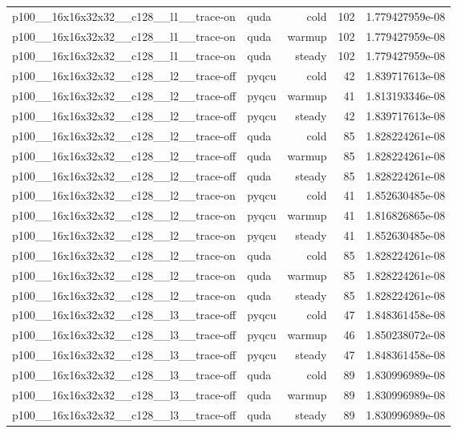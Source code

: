 \begin{table}[htbp]
\begin{tabular}{@{}llrrr@{}}
p100\_\_16x16x32x32\_\_c128\_\_l1\_\_trace-on & quda & cold & 102 & 1.779427959e-08 \\
p100\_\_16x16x32x32\_\_c128\_\_l1\_\_trace-on & quda & warmup & 102 & 1.779427959e-08 \\
p100\_\_16x16x32x32\_\_c128\_\_l1\_\_trace-on & quda & steady & 102 & 1.779427959e-08 \\
p100\_\_16x16x32x32\_\_c128\_\_l2\_\_trace-off & pyqcu & cold & 42 & 1.839717613e-08 \\
p100\_\_16x16x32x32\_\_c128\_\_l2\_\_trace-off & pyqcu & warmup & 41 & 1.813193346e-08 \\
p100\_\_16x16x32x32\_\_c128\_\_l2\_\_trace-off & pyqcu & steady & 42 & 1.839717613e-08 \\
p100\_\_16x16x32x32\_\_c128\_\_l2\_\_trace-off & quda & cold & 85 & 1.828224261e-08 \\
p100\_\_16x16x32x32\_\_c128\_\_l2\_\_trace-off & quda & warmup & 85 & 1.828224261e-08 \\
p100\_\_16x16x32x32\_\_c128\_\_l2\_\_trace-off & quda & steady & 85 & 1.828224261e-08 \\
p100\_\_16x16x32x32\_\_c128\_\_l2\_\_trace-on & pyqcu & cold & 41 & 1.852630485e-08 \\
p100\_\_16x16x32x32\_\_c128\_\_l2\_\_trace-on & pyqcu & warmup & 41 & 1.816826865e-08 \\
p100\_\_16x16x32x32\_\_c128\_\_l2\_\_trace-on & pyqcu & steady & 41 & 1.852630485e-08 \\
p100\_\_16x16x32x32\_\_c128\_\_l2\_\_trace-on & quda & cold & 85 & 1.828224261e-08 \\
p100\_\_16x16x32x32\_\_c128\_\_l2\_\_trace-on & quda & warmup & 85 & 1.828224261e-08 \\
p100\_\_16x16x32x32\_\_c128\_\_l2\_\_trace-on & quda & steady & 85 & 1.828224261e-08 \\
p100\_\_16x16x32x32\_\_c128\_\_l3\_\_trace-off & pyqcu & cold & 47 & 1.848361458e-08 \\
p100\_\_16x16x32x32\_\_c128\_\_l3\_\_trace-off & pyqcu & warmup & 46 & 1.850238072e-08 \\
p100\_\_16x16x32x32\_\_c128\_\_l3\_\_trace-off & pyqcu & steady & 47 & 1.848361458e-08 \\
p100\_\_16x16x32x32\_\_c128\_\_l3\_\_trace-off & quda & cold & 89 & 1.830996989e-08 \\
p100\_\_16x16x32x32\_\_c128\_\_l3\_\_trace-off & quda & warmup & 89 & 1.830996989e-08 \\
p100\_\_16x16x32x32\_\_c128\_\_l3\_\_trace-off & quda & steady & 89 & 1.830996989e-08 \\

\end{tabular}
\end{table}
